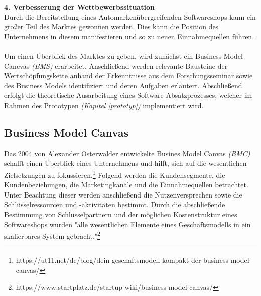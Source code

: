 \textbf{4. Verbesserung der Wettbewerbssituation}\\
Durch die Bereitstellung eines Automarkenübergreifenden Softwareshops kann ein großer Teil des Marktes gewonnen werden. Dies kann die Position des Unternehmens in diesem manifestieren und so zu neuen Einnahmequellen führen.\\\\

Um einen Überblick des Marktes zu geben, wird zunächst ein Business Model Cancvas \textit{(BMS)} erarbeitet. Anschließend werden relevante Bausteine der Wertschöpfungskette anhand der Erkenntnisse aus dem Forschungsseminar sowie des Business Models identifiziert und deren Aufgaben erläutert. Abschließend erfolgt die theoretische Ausarbeitung eines Software-Absatzprozesses, welcher im Rahmen des Prototypen \textit{(Kapitel \ref{prototyp})} implementiert wird. 

\subsection{Business Model Canvas}
Das 2004 von Alexander Osterwalder entwickelte Busines Model Canvas \textit{(BMC)} schafft einen Überblick eines Unternehmens und hilft, sich auf die wesentlichen Zielsetzungen zu fokussieren.\footnote{https://ut11.net/de/blog/dein-geschaftsmodell-kompakt-der-business-model-canvas/} Folgend werden die Kundensegmente, die Kundenbeziehungen, die Marketingkanäle und die Einnahmequellen betrachtet. Unter Beachtung dieser werden anschließend die Nutzenversprechen sowie die Schlüsselressourcen und -aktivitäten bestimmt. Durch die abschließende Bestimmung von Schlüsselpartnern und der möglichen Kostenstruktur eines Softwareshops wurden "alle wesentlichen Elemente eines Geschäftsmodells in ein skalierbares System gebracht."\footnote{https://www.startplatz.de/startup-wiki/business-model-canvas/}

